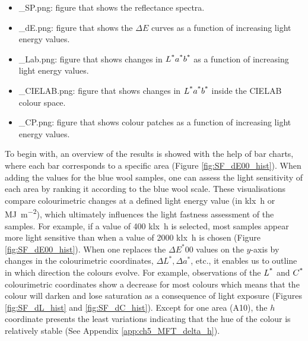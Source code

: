 
\vspace{2mm}

\begin{itemize}
    \item \_SP.png: figure that shows the reflectance spectra.
    \item \_dE.png: figure that shows the $\Delta E$ curves as a function of increasing light energy values.
    \item \_Lab.png: figure that shows changes in $L\textsuperscript{*}a\textsuperscript{*}b\textsuperscript{*}$ as a function of increasing light energy values.
    \item \_CIELAB.png: figure that shows changes in $L\textsuperscript{*}a\textsuperscript{*}b\textsuperscript{*}$ inside the CIELAB colour space.
    \item \_CP.png: figure that shows colour patches as a function of increasing light energy values.
\end{itemize}

To begin with, an overview of the results is showed with the help of bar charts, where each bar corresponds to a specific area (Figure \ref{fig:SF_dE00_hist}). When adding the values for the blue wool samples, one can assess the light sensitivity of each area by ranking it according to the blue wool scale. These visualisations compare colourimetric changes at a defined light energy value (in \unit{\kilo\lux\hour} or \unit{\mega\joule\per\square\metre}), which ultimately influences the light fastness assessment of the samples. For example, if a value of 400 \unit{\kilo\lux\hour} is selected, most samples appear more light sensitive than when a value of 2000 \unit{\kilo\lux\hour} is chosen (Figure \ref{fig:SF_dE00_hist}). When one replaces the $\Delta E^*{00}$ values on the $y$-axis by changes in the colourimetric coordinates, \ie $\Delta L^*, \Delta a^*$, etc., it enables us to outline in which direction the colours evolve. For example, observations of the $L\textsuperscript{*}$ and $C\textsuperscript{*}$ colourimetric coordinates show a decrease for most colours which means that the colour will darken and lose saturation as a consequence of light exposure (Figures \ref{fig:SF_dL_hist} and \ref{fig:SF_dC_hist}). Except for one area (A10), the $h$ coordinate presents the least variations indicating that the hue of the colour is relatively stable (See Appendix \ref{app:ch5_MFT_delta_h}). \\



